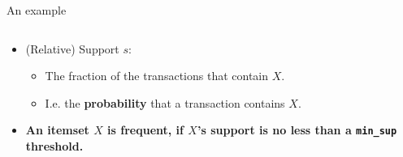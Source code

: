 \documentclass[aspectratio=169,t,xcolor=dvipsnames]{beamer}
\begin{document}
{\begin{frame}{An example}
\begin{columns}
\begin{column}{0.5\textwidth}
\begin{itemize}
            \begin{itemize}
              \item Frequency or occurrence of $X$.
            \end{itemize}
            \item (Relative) Support $s$:
            \begin{itemize}
              \item The fraction of the transactions that contain $X$.
              \item I.e. the \textbf{probability} that a transaction contains $X$.
            \end{itemize}
            \item \textbf{An itemset $X$ is frequent, if $X$'s support is no less than a \texttt{min\_sup} threshold.}
          \end{itemize}
          \end{column}
        \end{columns}
    \end{frame}
  }
\end{document}
